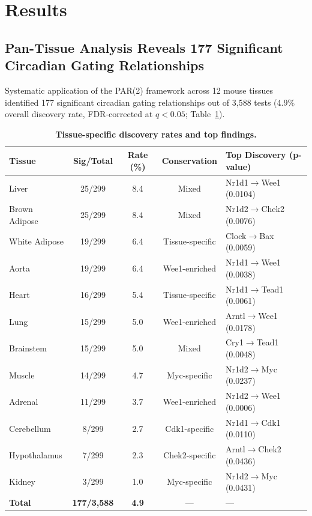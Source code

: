 \documentclass[11pt,letterpaper]{article}
\begin{document}
\section{Results}

\subsection{Pan-Tissue Analysis Reveals 177 Significant Circadian Gating Relationships}

Systematic application of the PAR(2) framework across 12 mouse tissues identified 177 significant circadian gating relationships out of 3,588 tests (4.9\% overall discovery rate, FDR-corrected at $q < 0.05$; Table~\ref{tab:tissue_summary}).

\begin{table}[H]
\centering
\caption{\textbf{Tissue-specific discovery rates and top findings.}}
\label{tab:tissue_summary}
\begin{tabular}{lcccl}
\toprule
\textbf{Tissue} & \textbf{Sig/Total} & \textbf{Rate (\%)} & \textbf{Conservation} & \textbf{Top Discovery (p-value)} \\
\midrule
Liver & 25/299 & 8.4 & Mixed & Nr1d1$\rightarrow$Wee1 (0.0104) \\
Brown Adipose & 25/299 & 8.4 & Mixed & Nr1d2$\rightarrow$Chek2 (0.0076) \\
White Adipose & 19/299 & 6.4 & Tissue-specific & Clock$\rightarrow$Bax (0.0059) \\
Aorta & 19/299 & 6.4 & Wee1-enriched & Nr1d1$\rightarrow$Wee1 (0.0038) \\
Heart & 16/299 & 5.4 & Tissue-specific & Nr1d1$\rightarrow$Tead1 (0.0061) \\
Lung & 15/299 & 5.0 & Wee1-enriched & Arntl$\rightarrow$Wee1 (0.0178) \\
Brainstem & 15/299 & 5.0 & Mixed & Cry1$\rightarrow$Tead1 (0.0048) \\
Muscle & 14/299 & 4.7 & Myc-specific & Nr1d2$\rightarrow$Myc (0.0237) \\
Adrenal & 11/299 & 3.7 & Wee1-enriched & Nr1d2$\rightarrow$Wee1 (0.0006) \\
Cerebellum & 8/299 & 2.7 & Cdk1-specific & Nr1d1$\rightarrow$Cdk1 (0.0110) \\
Hypothalamus & 7/299 & 2.3 & Chek2-specific & Arntl$\rightarrow$Chek2 (0.0436) \\
Kidney & 3/299 & 1.0 & Myc-specific & Nr1d2$\rightarrow$Myc (0.0431) \\
\midrule
\textbf{Total} & \textbf{177/3,588} & \textbf{4.9} & --- & --- \\
\bottomrule
\end{tabular}
\end{table}
\end{document}
